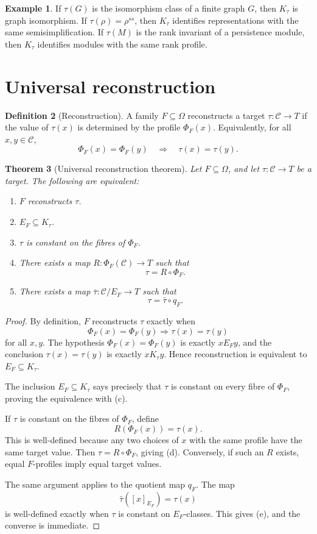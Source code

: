 \documentclass[11pt]{article}
\newtheorem{theorem}{Theorem}[section]
\theoremstyle{definition}
\newtheorem{definition}[theorem]{Definition}
\newtheorem{example}[theorem]{Example}
\theoremstyle{remark}
\begin{document}
\begin{example}
If \(\tau(G)\) is the isomorphism class of a finite graph \(G\), then \(K_\tau\) is graph isomorphism.  If \(\tau(\rho)=\rho^{ss}\), then \(K_\tau\) identifies representations with the same semisimplification.  If \(\tau(M)\) is the rank invariant of a persistence module, then \(K_\tau\) identifies modules with the same rank profile.
\end{example}

\section{Universal reconstruction}

\begin{definition}[Reconstruction]
A family \(F\subseteq\Omega\) reconstructs a target \(\tau:\mathcal C\to T\) if the value of \(\tau(x)\) is determined by the profile \(\Phi_F(x)\).  Equivalently, for all \(x,y\in\mathcal C\),
\[
\Phi_F(x)=\Phi_F(y)
\quad\Longrightarrow\quad
\tau(x)=\tau(y).
\]
\end{definition}

\begin{theorem}[Universal reconstruction theorem]
Let \(F\subseteq\Omega\), and let \(\tau:\mathcal C\to T\) be a target.  The following are equivalent:
\begin{enumerate}[label=(\alph*)]
\item \(F\) reconstructs \(\tau\).
\item \(E_F\subseteq K_\tau\).
\item \(\tau\) is constant on the fibres of \(\Phi_F\).
\item There exists a map \(R:\Phi_F(\mathcal C)\to T\) such that
\[
\tau=R\circ\Phi_F.
\]
\item There exists a map \(\bar{\tau}:\mathcal C/E_F\to T\) such that
\[
\tau=\bar{\tau}\circ q_F.
\]
\end{enumerate}
\end{theorem}

\begin{proof}
By definition, \(F\) reconstructs \(\tau\) exactly when
\[
\Phi_F(x)=\Phi_F(y)\Rightarrow \tau(x)=\tau(y)
\]
for all \(x,y\).  The hypothesis \(\Phi_F(x)=\Phi_F(y)\) is exactly \(xE_Fy\), and the conclusion \(\tau(x)=\tau(y)\) is exactly \(xK_\tau y\).  Hence reconstruction is equivalent to \(E_F\subseteq K_\tau\).

The inclusion \(E_F\subseteq K_\tau\) says precisely that \(\tau\) is constant on every fibre of \(\Phi_F\), proving the equivalence with (c).

If \(\tau\) is constant on the fibres of \(\Phi_F\), define
\[
R(\Phi_F(x))=\tau(x).
\]
This is well-defined because any two choices of \(x\) with the same profile have the same target value.  Then \(\tau=R\circ\Phi_F\), giving (d).  Conversely, if such an \(R\) exists, equal \(F\)-profiles imply equal target values.

The same argument applies to the quotient map \(q_F\).  The map
\[
\bar{\tau}([x]_{E_F})=\tau(x)
\]
is well-defined exactly when \(\tau\) is constant on \(E_F\)-classes.  This gives (e), and the converse is immediate.
\end{proof}
\end{document}
